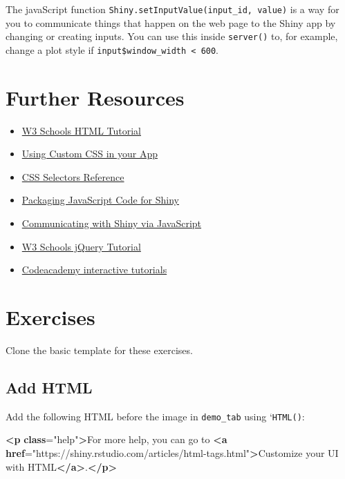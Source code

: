\documentclass[
  oneside]{book}
\newenvironment{Shaded}{\begin{snugshade}}{\end{snugshade}}
\newcommand{\ErrorTok}[1]{\textcolor[rgb]{0.64,0.00,0.00}{\textbf{#1}}}
\newcommand{\KeywordTok}[1]{\textcolor[rgb]{0.13,0.29,0.53}{\textbf{#1}}}
\newcommand{\NormalTok}[1]{#1}
\newcommand{\OtherTok}[1]{\textcolor[rgb]{0.56,0.35,0.01}{#1}}
\newcommand{\StringTok}[1]{\textcolor[rgb]{0.31,0.60,0.02}{#1}}
\providecommand{\tightlist}{%
  \setlength{\itemsep}{0pt}\setlength{\parskip}{0pt}}
\begin{document}
The javaScript function \texttt{Shiny.setInputValue(input\_id,\ value)} is a way for you to communicate things that happen on the web page to the Shiny app by changing or creating inputs. You can use this inside \texttt{server}\texttt{()} to, for example, change a plot style if \texttt{input\$window\_width\ \textless{}\ 600}.

\hypertarget{resources-web}{%
\section{Further Resources}\label{resources-web}}

\begin{itemize}
\tightlist
\item
  \href{https://www.w3schools.com/html/}{W3 Schools HTML Tutorial}
\item
  \href{https://shiny.rstudio.com/articles/css.html}{Using Custom CSS in your App}
\item
  \href{https://www.w3schools.com/cssref/css_selectors.asp}{CSS Selectors Reference}
\item
  \href{https://shiny.rstudio.com/articles/packaging-javascript.html}{Packaging JavaScript Code for Shiny}
\item
  \href{https://shiny.rstudio.com/articles/communicating-with-js.html}{Communicating with Shiny via JavaScript}
\item
  \href{https://www.w3schools.com/jquERy/default.asp}{W3 Schools jQuery Tutorial}
\item
  \href{https://www.codecademy.com/en/tracks/htmlcss}{Codeacademy interactive tutorials}
\end{itemize}

\hypertarget{exercises-web}{%
\section{Exercises}\label{exercises-web}}

Clone the basic template for these exercises.

\hypertarget{add-html}{%
\subsection*{Add HTML}\label{add-html}}

Add the following HTML before the image in \texttt{demo\_tab} using `\texttt{HTML}\texttt{()}:

\begin{Shaded}
\begin{Highlighting}[]
\KeywordTok{\textless{}p} \ErrorTok{class}\OtherTok{=}\StringTok{"help"}\KeywordTok{\textgreater{}}\NormalTok{For more help, you can go to }\KeywordTok{\textless{}a} \ErrorTok{href}\OtherTok{=}\StringTok{"https://shiny.rstudio.com/articles/html{-}tags.html"}\KeywordTok{\textgreater{}}\NormalTok{Customize your UI with HTML}\KeywordTok{\textless{}/a\textgreater{}}\NormalTok{.}\KeywordTok{\textless{}/p\textgreater{}}
\end{Highlighting}
\end{Shaded}
\end{document}
